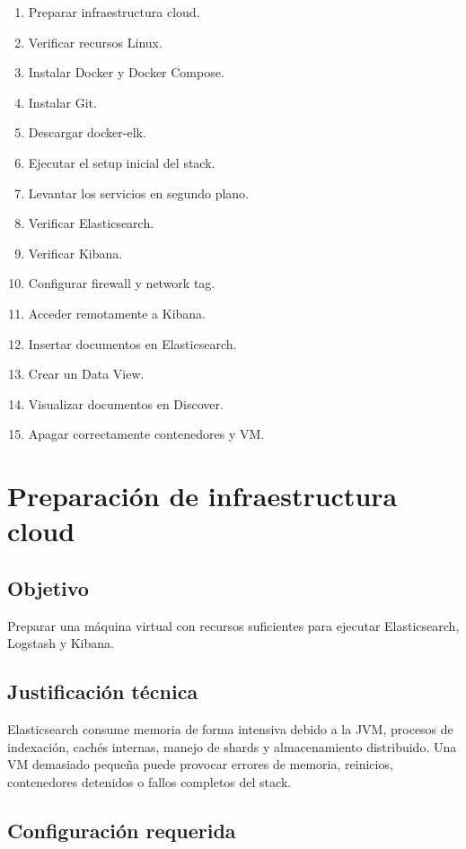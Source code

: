 \documentclass[
  coursetitle={Cómputo Nube y Tecnologías Emergentes},
  coursehours={96},
  coursedate={Verano 2026},
  doctype={Práctica},
  otherlangs={english,french},
  authorname={Lázaro},
  authorsurname={Bustio-Martínez},
  authortitle={PhD},
  role={Profesor Investigador},
  email={lbustio@inaoe.mx},
  phone={5559504000},
  ext={7459},
  institution={Instituto Nacional de Astrofísica, Óptica y Electrónica (INAOE)},
  department={Maestría en Ciencias en Tecnologías de Seguridad},
  address={Luis Enrique Erro 1, Sta. Ma. Tonantzintla, San Andrés Cholula, CP 72840, Puebla, México},
  margin={0.5in}
]{../../lbustio_lecture_notes}
\begin{document}
\begin{enumerate}
    \item Preparar infraestructura cloud.
    \item Verificar recursos Linux.
    \item Instalar Docker y Docker Compose.
    \item Instalar Git.
    \item Descargar docker-elk.
    \item Ejecutar el setup inicial del stack.
    \item Levantar los servicios en segundo plano.
    \item Verificar Elasticsearch.
    \item Verificar Kibana.
    \item Configurar firewall y network tag.
    \item Acceder remotamente a Kibana.
    \item Insertar documentos en Elasticsearch.
    \item Crear un Data View.
    \item Visualizar documentos en Discover.
    \item Apagar correctamente contenedores y VM.
\end{enumerate}

\section{Preparación de infraestructura cloud}

\subsection{Objetivo}

Preparar una máquina virtual con recursos suficientes para ejecutar Elasticsearch, Logstash y Kibana.

\subsection{Justificación técnica}

Elasticsearch consume memoria de forma intensiva debido a la JVM, procesos de indexación, cachés internas, manejo de shards y almacenamiento distribuido. Una VM demasiado pequeña puede provocar errores de memoria, reinicios, contenedores detenidos o fallos completos del stack.

\subsection{Configuración requerida}
\end{document}
